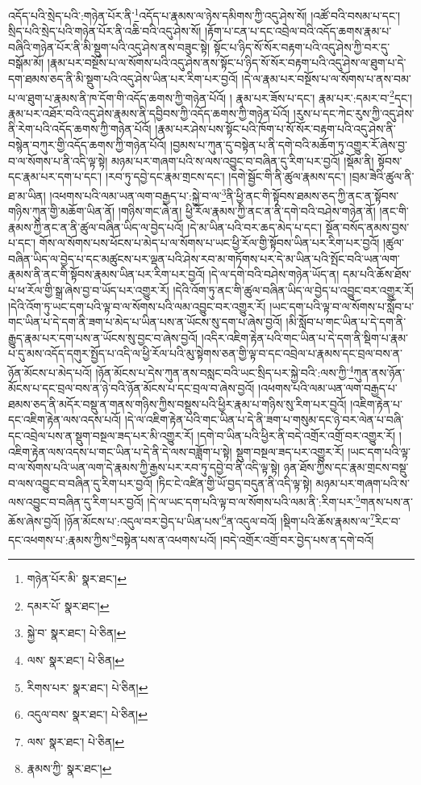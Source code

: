 འདོད་པའི་སྲེད་པའི་:གཉེན་པོར་ནི་\footnote{གཉེན་པོར་མི་  སྣར་ཐང་། }འདོད་པ་རྣམས་ལ་ཉེས་དམིགས་ཀྱི་འདུ་ཤེས་སོ། །འཚོ་བའི་བསམ་པ་དང་། སྲིད་པའི་སྲེད་པའི་གཉེན་པོར་ནི་འཆི་བའི་འདུ་ཤེས་སོ། །རྟོག་པ་ངན་པ་དང་འབྲེལ་བའི་འདོད་ཆགས་རྣམ་པ་བཞིའི་གཉེན་པོར་ནི་མི་སྡུག་པའི་འདུ་ཤེས་ནས་བཟུང་སྟེ། སྟོང་པ་ཉིད་སོ་སོར་བརྟག་པའི་འདུ་ཤེས་ཀྱི་བར་དུ་བསྒོམ་མོ། །རྣམ་པར་བསྔོས་པ་ལ་སོགས་པའི་འདུ་ཤེས་ནས་སྟོང་པ་ཉིད་སོ་སོར་བརྟག་པའི་འདུ་ཤེས་ལ་ཐུག་པ་དེ་དག་ཐམས་ཅད་ནི་མི་སྡུག་པའི་འདུ་ཤེས་ཡིན་པར་རིག་པར་བྱའོ། །དེ་ལ་རྣམ་པར་བསྔོས་པ་ལ་སོགས་པ་ནས་བམ་པ་ལ་ཐུག་པ་རྣམས་ནི་ཁ་དོག་གི་འདོད་ཆགས་ཀྱི་གཉེན་པོའོ། །
རྣམ་པར་ཟོས་པ་དང་། རྣམ་པར་:དམར་བ་\footnote{དམར་པོ་  སྣར་ཐང་། }དང་། རྣམ་པར་འཐོར་བའི་འདུ་ཤེས་རྣམས་ནི་དབྱིབས་ཀྱི་འདོད་ཆགས་ཀྱི་གཉེན་པོའོ། །རུས་པ་དང་ཀེང་རུས་ཀྱི་འདུ་ཤེས་ནི་རེག་པའི་འདོད་ཆགས་ཀྱི་གཉེན་པོའོ། །རྣམ་པར་ཤེས་པས་སྟོང་པའི་ཁོག་པ་སོ་སོར་བརྟག་པའི་འདུ་ཤེས་ནི་བསྙེན་བཀུར་གྱི་འདོད་ཆགས་ཀྱི་གཉེན་པོའོ། །བྱམས་པ་ཀུན་དུ་བསྟེན་པ་ནི་དགེ་བའི་མཆོག་ཏུ་འགྱུར་རོ་ཞེས་བྱ་བ་ལ་སོགས་པ་ནི་འདི་ལྟ་སྟེ། མཉམ་པར་གཞག་པའི་ས་ལས་འབྱུང་བ་བཞིན་དུ་རིག་པར་བྱའོ། །སྡོམ་ནི། སྟོབས་དང་རྣམ་པར་དག་པ་དང་། །རབ་ཏུ་དབྱེ་དང་རྣམ་གྲངས་དང་། །དགེ་སྦྱོང་གི་ནི་ཚུལ་རྣམས་དང་། །བྲམ་ཟེའི་ཚུལ་ནི་ཐ་མ་ཡིན། །འཕགས་པའི་ལམ་ཡན་ལག་བརྒྱད་པ་:སྐྱེ་བ་ལ་\footnote{སྐྱེ་བ་  སྣར་ཐང་།  པེ་ཅིན། }ནི་ཕྱི་ནང་གི་སྟོབས་ཐམས་ཅད་ཀྱི་ནང་ན་སྟོབས་གཉིས་ཀུན་གྱི་མཆོག་ཡིན་ནོ། །གཉིས་གང་ཞེ་ན། ཕྱི་རོལ་རྣམས་ཀྱི་ནང་ན་ནི་དགེ་བའི་བཤེས་གཉེན་ནོ། །ནང་གི་རྣམས་ཀྱི་ནང་ན་ནི་ཚུལ་བཞིན་ཡིད་ལ་བྱེད་པའོ། །དེ་མ་ཡིན་པའི་བར་ཆད་མེད་པ་དང་། སྔོན་བསོད་ནམས་བྱས་པ་དང་། གོས་ལ་སོགས་པས་ཕོངས་པ་མེད་པ་ལ་སོགས་པ་ཡང་ཕྱི་རོལ་གྱི་སྟོབས་ཡིན་པར་རིག་པར་བྱའོ། །ཚུལ་བཞིན་ཡིད་ལ་བྱེད་པ་དང་མཚུངས་པར་ལྡན་པའི་ཤེས་རབ་མ་གཏོགས་པར་དེ་མ་ཡིན་པའི་སྤོང་བའི་ཡན་ལག་རྣམས་ནི་ནང་གི་སྟོབས་རྣམས་ཡིན་པར་རིག་པར་བྱའོ། །དེ་ལ་དགེ་བའི་བཤེས་གཉེན་ཡོད་ན། དམ་པའི་ཆོས་ཐོས་པ་ཕ་རོལ་གྱི་སྒྲ་ཞེས་བྱ་བ་ཡོད་པར་འགྱུར་རོ། །དེའི་འོག་ཏུ་ནང་གི་ཚུལ་བཞིན་ཡིད་ལ་བྱེད་པ་འབྱུང་བར་འགྱུར་རོ། །དེའི་འོག་ཏུ་ཡང་དག་པའི་ལྟ་བ་ལ་སོགས་པའི་ལམ་འབྱུང་བར་འགྱུར་རོ། །ཡང་དག་པའི་ལྟ་བ་ལ་སོགས་པ་སློབ་པ་གང་ཡིན་པ་དེ་དག་ནི་ཟག་པ་མེད་པ་ཡིན་པས་ན་ཡོངས་སུ་དག་པ་ཞེས་བྱའོ། །མི་སློབ་པ་གང་ཡིན་པ་དེ་དག་ནི་རྒྱུད་རྣམ་པར་དག་པས་ན་ཡོངས་སུ་བྱང་བ་ཞེས་བྱའོ། །འདིར་འཇིག་རྟེན་པའི་གང་ཡིན་པ་དེ་དག་ནི་སྡིག་པ་རྣམ་པ་དུ་མས་འདོད་དགུར་སྤྱོད་པ་འདི་ལ་ཕྱི་རོལ་པའི་མུ་སྟེགས་ཅན་གྱི་ལྟ་བ་དང་འབྲེལ་པ་རྣམས་དང་བྲལ་བས་ན་ཉོན་མོངས་པ་མེད་པའོ། །ཉོན་མོངས་པ་དེས་ཀུན་ནས་བསླང་བའི་ཡང་སྲིད་པར་སྐྱེ་བའི་:ལས་ཀྱི་\footnote{ལས་  སྣར་ཐང་།  པེ་ཅིན། }ཀུན་ནས་ཉོན་མོངས་པ་དང་བྲལ་བས་ན་ཉེ་བའི་ཉོན་མོངས་པ་དང་བྲལ་བ་ཞེས་བྱའོ། །འཕགས་པའི་ལམ་ཡན་ལག་བརྒྱད་པ་ཐམས་ཅད་ནི་མདོར་བསྡུ་ན་གནས་གཉིས་ཀྱིས་བསྡུས་པའི་ཕྱིར་རྣམ་པ་གཉིས་སུ་རིག་པར་བྱའོ། །འཇིག་རྟེན་པ་དང་འཇིག་རྟེན་ལས་འདས་པའོ། །དེ་ལ་འཇིག་རྟེན་པའི་གང་ཡིན་པ་དེ་ནི་ཟག་པ་གསུམ་དང་ཉེ་བར་ལེན་པ་བཞི་དང་འབྲེལ་པས་ན་སྡུག་བསྔལ་ཟད་པར་མི་འགྱུར་རོ། །དགེ་བ་ཡིན་པའི་ཕྱིར་ནི་བདེ་འགྲོར་འགྲོ་བར་འགྱུར་རོ། །འཇིག་རྟེན་ལས་འདས་པ་གང་ཡིན་པ་དེ་ནི་དེ་ལས་བཟློག་པ་སྟེ། སྡུག་བསྔལ་ཟད་པར་འགྱུར་རོ། །ཡང་དག་པའི་ལྟ་བ་ལ་སོགས་པའི་ཡན་ལག་དེ་རྣམས་ཀྱི་རྒྱས་པར་རབ་ཏུ་དབྱེ་བ་ནི་འདི་ལྟ་སྟེ། ཉན་ཐོས་ཀྱིས་དང་རྣམ་གྲངས་བསྡུ་བ་ལས་འབྱུང་བ་བཞིན་དུ་རིག་པར་བྱའོ། །ཏིང་ངེ་འཛིན་གྱི་ཡོ་བྱད་བདུན་ནི་འདི་ལྟ་སྟེ། མཉམ་པར་གཞག་པའི་ས་ལས་འབྱུང་བ་བཞིན་དུ་རིག་པར་བྱའོ། །དེ་ལ་ཡང་དག་པའི་ལྟ་བ་ལ་སོགས་པའི་ལམ་ནི་:རིག་པར་\footnote{རིགས་པར་  སྣར་ཐང་།  པེ་ཅིན། }གནས་པས་ན་ཆོས་ཞེས་བྱའོ། །ཉོན་མོངས་པ་:འདུལ་བར་བྱེད་པ་ཡིན་པས་\footnote{འདུལ་བས་  སྣར་ཐང་།  པེ་ཅིན། }ན་འདུལ་བའོ། །སྡིག་པའི་ཆོས་རྣམས་ལ་\footnote{ལས་  སྣར་ཐང་།  པེ་ཅིན། }རིང་བ་དང་འཕགས་པ་:རྣམས་ཀྱིས་\footnote{རྣམས་ཀྱི་  སྣར་ཐང་། }བསྟེན་པས་ན་འཕགས་པའོ། །བདེ་འགྲོར་འགྲོ་བར་བྱེད་པས་ན་དགེ་བའོ། 
